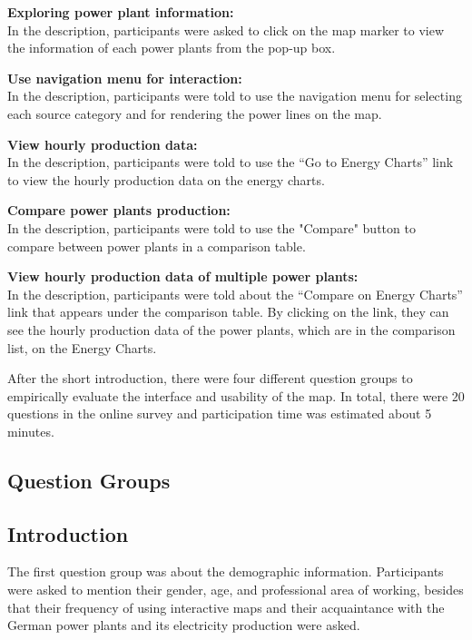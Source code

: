 \textbf{Exploring power plant information:}\\
In the description, participants were asked to click on the map marker to view the information of each power plants from the pop-up box. 

\textbf{Use navigation menu for interaction:}\\
In the description, participants were told to use the navigation menu for selecting each source category and for rendering the power lines on the map.

\textbf{View hourly production data:}\\
In the description, participants were told to use the “Go to Energy Charts” link to view the hourly production data on the energy charts.

\textbf{Compare power plants production:}\\
In the description, participants were told to use the "Compare" button to  compare between power plants in a comparison table.

\textbf{View hourly production data of multiple power plants:}\\
In the description, participants were told about the “Compare on Energy Charts” link that appears under the comparison table. By clicking on the link, they can see the hourly production data of the power plants, which are in the comparison list, on the Energy Charts. 

After the short introduction, there were four different question groups to empirically evaluate the interface and usability of the map. In total, there were 20 questions in the online survey and participation time was estimated about 5 minutes.  

\subsection{Question Groups}
\label{sssec:quesGroup} 

\subsection*{Introduction}
\label{sssec:intro}

The first question group was about the demographic information. Participants were asked to mention their gender, age, and professional area of working, besides that their frequency of using interactive maps and their acquaintance with the German power plants and its electricity production were asked. 


